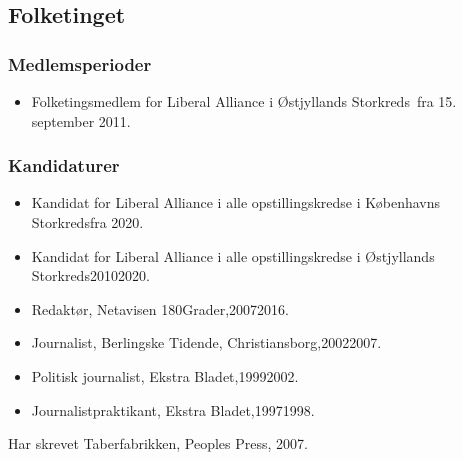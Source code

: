 \documentclass[11pt, a4paper]{awesome-cv}
\begin{document}
\begin{cvletter}
\subsection*{Folketinget}
\subsubsection*{Medlemsperioder}
\begin{itemize}
\item Folketingsmedlem for Liberal Alliance i Østjyllands Storkreds fra 15. september 2011.
\end{itemize}
\subsubsection*{Kandidaturer}
\begin{itemize}
\item Kandidat for Liberal Alliance i alle opstillingskredse i Københavns Storkredsfra 2020.
\item Kandidat for Liberal Alliance i alle opstillingskredse i Østjyllands Storkreds20102020.
\end{itemize}
\begin{itemize}
\item Redaktør, Netavisen 180Grader,20072016.
\item Journalist, Berlingske Tidende, Christiansborg,20022007.
\item Politisk journalist, Ekstra Bladet,19992002.
\item Journalistpraktikant, Ekstra Bladet,19971998.
\end{itemize}
Har skrevet Taberfabrikken, Peoples Press, 2007.

\end{cvletter}
\end{document}
